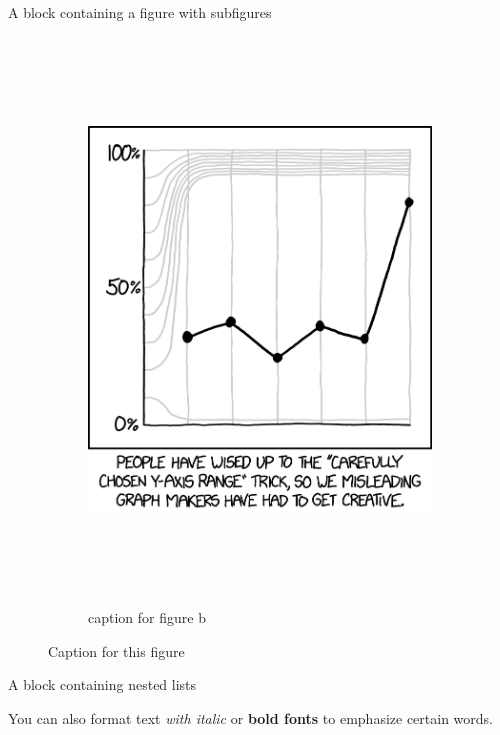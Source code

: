 \documentclass[final]{beamer}
\newlength{\colwidth}
\begin{document}
\begin{frame}[t]
\begin{columns}[t]
\begin{column}{\colwidth}
\begin{block}{A block containing a figure with subfigures}
\begin{figure}
\begin{subfigure}{0.49\textwidth}
        \includegraphics[height=15cm]{./images/y_axis_2x.png}
        \caption{caption for figure b}   %
      \end{subfigure}
      \caption{Caption for this figure}
    \end{figure}

  \end{block}

  \vspace{-1em}    %

  \begin{block}{A block containing nested lists}

    You can also format text \textit{with italic} or \textbf{bold fonts} to emphasize certain words.


\end{block}
\end{column}
\end{columns}
\end{frame}
\end{document}
